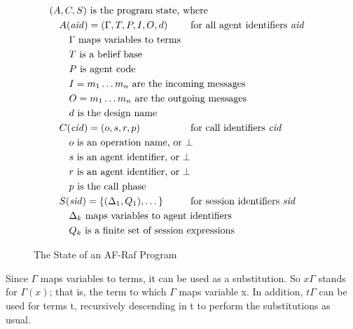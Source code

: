 \documentclass[a4paper,12pt,oneside,fleqn]{book} %
\begin{document}
\begin{figure}
\def\.#1{\text{\rlap{ #1}}}
\begin{align*}
&(A, C, S)\.{is the program state, where} \\
&\quad A({\it aid})=(\Gamma, T, P, I, O, d)
  &&\text{for all agent identifiers~$\it aid$} \\
&\quad\quad \text{$\Gamma$ maps variables to terms} \\
&\quad\quad T\.{is a belief base} \\
&\quad\quad P\.{is agent code} \\
&\quad\quad I=m_1\ldots m_n\.{are the incoming messages} \\
&\quad\quad O=m_1\ldots m_n\.{are the outgoing messages} \\
&\quad\quad d\.{is the design name} \\
&\quad C({\it cid})=(o,s,r,p)
  &&\text{for call identifiers~$\it cid$} \\
&\quad\quad o\.{is an operation name, or $\bot$} \\
&\quad\quad s\.{is an agent identifier, or $\bot$} \\
&\quad\quad r\.{is an agent identifier, or $\bot$} \\
&\quad\quad p\.{is the call phase} \\
&\quad S({\it sid})=\{(\Delta_1,Q_1),\ldots\,\}
  &&\text{for session identifiers~$\it sid$} \\
&\quad\quad \Delta_k\.{maps variables to agent identifiers} \\
&\quad\quad Q_k\.{is a finite set of session expressions}
\end{align*}
\caption{The State of an AF-Raf Program}
\label{fig:af-raf-state}
\end{figure}

\begin{remark}
  Since $\Gamma$ maps variables to terms, it can be used as a substitution.
  So $x\Gamma$ stands for $\Gamma(x)$; that is, the term to which $\Gamma$
  maps variable x. In addition, $t\Gamma$ can be used for terms t,
  recursively descending in t to perform the substitutions as usual.
  \label{r:subst}
\end{remark}
\end{document}
